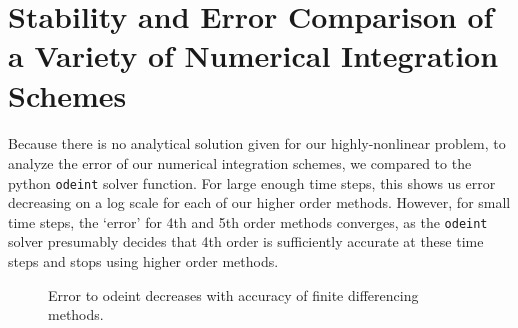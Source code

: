 \documentclass[12pt]{article}
\begin{document}
\section{Stability and Error Comparison of a Variety of Numerical Integration Schemes}
\paragraph{}Because there is no analytical solution given for our highly-nonlinear problem, to analyze the error of our numerical integration schemes, we compared to the python \texttt{odeint} solver function. For large enough time steps, this shows us error decreasing on a log scale for each of our higher order methods. However, for small time steps, the `error' for 4th and 5th order methods converges, as the \texttt{odeint} solver presumably decides that 4th order is sufficiently accurate at these time steps and stops using higher order methods.\\
\begin{figure}[H]
  \centering
  \caption{Error to odeint decreases with accuracy of finite differencing methods.}
\end{figure}
\end{document}
